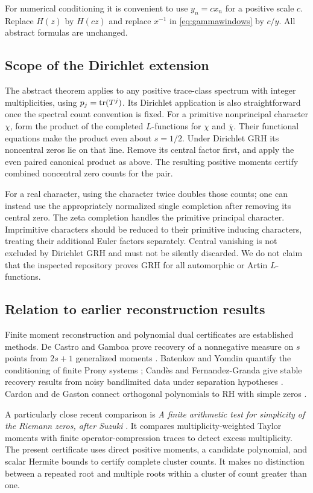 For numerical conditioning it is convenient to use $y_n=cx_n$ for a
positive scale $c$. Replace $H(z)$ by $H(cz)$ and replace $x^{-1}$ in
\eqref{eq:gammawindows} by $c/y$. All abstract formulas are unchanged.

\subsection{Scope of the Dirichlet extension}

The abstract theorem applies to any positive trace-class spectrum with
integer multiplicities, using $p_j=\operatorname{tr}(T^j)$. Its Dirichlet application is
also straightforward once the spectral count convention is fixed.
For a primitive nonprincipal character $\chi$, form the product of the
completed $L$-functions for $\chi$ and $\overline\chi$. Their functional
equations make the product even about $s=1/2$. Under Dirichlet GRH its
noncentral zeros lie on that line. Remove its central factor first, and
apply the even paired canonical product as above. The resulting positive
moments certify combined noncentral zero counts for the pair.

For a real character, using the character twice doubles those counts; one
can instead use the appropriately normalized single completion after
removing its central zero. The zeta completion handles the primitive
principal character. Imprimitive characters should be reduced to their
primitive inducing characters, treating their additional Euler factors
separately. Central vanishing is not excluded by Dirichlet GRH and must
not be silently discarded. We do not claim that the inspected repository
proves GRH for all automorphic or Artin $L$-functions.

\subsection{Relation to earlier reconstruction results}

Finite moment reconstruction and polynomial dual certificates are
established methods. De Castro and Gamboa prove recovery of a nonnegative
measure on $s$ points from $2s+1$ generalized moments \cite{decg}.
Batenkov and Yomdin quantify the conditioning of finite Prony systems
\cite{prony}; Cand\`es and Fernandez-Granda give stable recovery results
from noisy bandlimited data under separation hypotheses \cite{superres}.
Cardon and de Gaston connect orthogonal polynomials to RH with simple
zeros \cite{cardon}.

A particularly close recent comparison is \emph{A finite arithmetic test
for simplicity of the Riemann zeros, after Suzuki} \cite{ald}. It compares
multiplicity-weighted Taylor moments with finite operator-compression
traces to detect excess multiplicity. The present certificate uses direct
positive moments, a candidate polynomial, and scalar Hermite bounds to
certify complete cluster counts. It makes no distinction between a repeated
root and multiple roots within a cluster of count greater than one.

